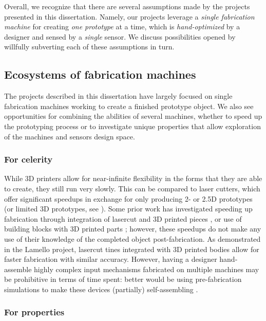 Overall, we recognize that there are several assumptions made by the projects presented in this dissertation. Namely, our projects leverage a \emph{single fabrication machine} for creating \emph{one prototype} at a time, which is \emph{hand-optimized} by a designer and sensed by a \emph{single} sensor. We discuss possibilities opened by willfully subverting each of these assumptions in turn.

\subsection{Ecosystems of fabrication machines}

The projects described in this dissertation have largely focused on single fabrication machines working to create a finished prototype object. We also see opportunities for combining the abilities of several machines, whether to speed up the prototyping process or to investigate unique properties that allow exploration of the machines and sensors design space.

    \subsubsection{For celerity}

    While 3D printers allow for near-infinite flexibility in the forms that they are able to create, they still run very slowly. This can be compared to laser cutters, which offer significant speedups in exchange for only producing 2- or 2.5D prototypes (or limited 3D prototypes, see \cite{mueller-laserorigami}). Some prior work has investigated speeding up fabrication through integration of lasercut and 3D printed pieces \cite{beyer-platener}, or use of building blocks with 3D printed parts \cite{mueller-fabrickation}; however, these speedups do not make any use of their knowledge of the completed object post-fabrication. As demonstrated in the Lamello project, lasercut tines integrated with 3D printed bodies allow for faster fabrication with similar accuracy. However, having a designer hand-assemble highly complex input mechanisms fabricated on multiple machines may be prohibitive in terms of time spent: better would be using pre-fabrication simulations to make these devices (partially) self-assembling \cite{tibbits-self-assembly}. 

    \subsubsection{For properties}
    
